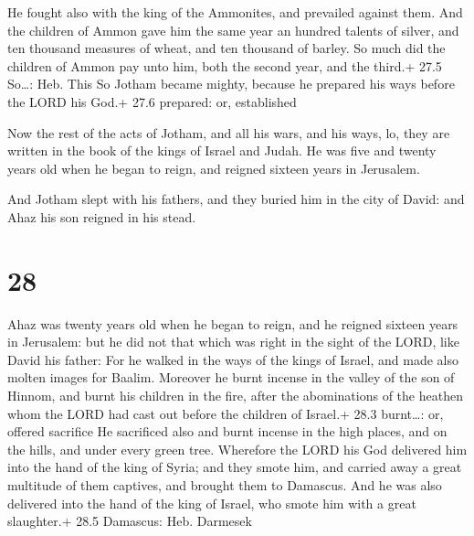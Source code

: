  He fought also with the king of the Ammonites, and
prevailed against them. And the children of Ammon gave him the same year
an hundred talents of silver, and ten thousand measures of wheat, and
ten thousand of barley. So much did the children of Ammon pay unto him,
both the second year, and the third.+ 27.5 So\ldots: Heb. This
 So Jotham became mighty, because he prepared his ways
before the LORD his God.+ 27.6 prepared: or, established

 Now the rest of the acts of Jotham, and all his wars, and
his ways, lo, they are written in the book of the kings of Israel and
Judah.  He was five and twenty years old when he began to
reign, and reigned sixteen years in Jerusalem.

 And Jotham slept with his fathers, and they buried him in
the city of David: and Ahaz his son reigned in his stead.

\hypertarget{section-27}{%
\section{28}\label{section-27}}

 Ahaz was twenty years old when he began to reign, and he
reigned sixteen years in Jerusalem: but he did not that which was right
in the sight of the LORD, like David his father:  For he
walked in the ways of the kings of Israel, and made also molten images
for Baalim.  Moreover he burnt incense in the valley of the
son of Hinnom, and burnt his children in the fire, after the
abominations of the heathen whom the LORD had cast out before the
children of Israel.+ 28.3 burnt\ldots: or, offered sacrifice
 He sacrificed also and burnt incense in the high places,
and on the hills, and under every green tree.  Wherefore the
LORD his God delivered him into the hand of the king of Syria; and they
smote him, and carried away a great multitude of them captives, and
brought them to Damascus. And he was also delivered into the hand of the
king of Israel, who smote him with a great slaughter.+ 28.5 Damascus:
Heb. Darmesek

